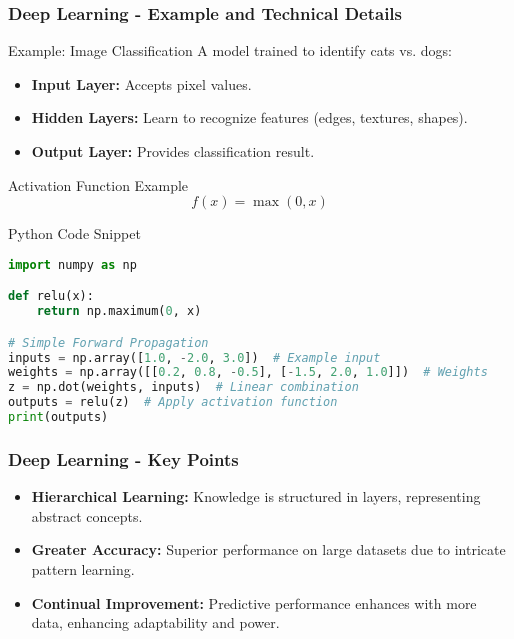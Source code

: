 \documentclass{beamer}
\begin{document}
\begin{frame}[fragile]
    \frametitle{Deep Learning - Example and Technical Details}
    \begin{block}{Example: Image Classification}
        A model trained to identify cats vs. dogs:
        \begin{itemize}
            \item \textbf{Input Layer:} Accepts pixel values.
            \item \textbf{Hidden Layers:} Learn to recognize features (edges, textures, shapes).
            \item \textbf{Output Layer:} Provides classification result.
        \end{itemize}
    \end{block}

    \begin{block}{Activation Function Example}
        \begin{equation}
            f(x) = \max(0, x)
        \end{equation}
    \end{block}

    \begin{block}{Python Code Snippet}
        \begin{lstlisting}[language=Python]
import numpy as np

def relu(x):
    return np.maximum(0, x)

# Simple Forward Propagation
inputs = np.array([1.0, -2.0, 3.0])  # Example input
weights = np.array([[0.2, 0.8, -0.5], [-1.5, 2.0, 1.0]])  # Weights
z = np.dot(weights, inputs)  # Linear combination
outputs = relu(z)  # Apply activation function
print(outputs)
        \end{lstlisting}
    \end{block}
\end{frame}

\begin{frame}[fragile]
    \frametitle{Deep Learning - Key Points}
    \begin{itemize}
        \item \textbf{Hierarchical Learning:} Knowledge is structured in layers, representing abstract concepts.
        \item \textbf{Greater Accuracy:} Superior performance on large datasets due to intricate pattern learning.
        \item \textbf{Continual Improvement:} Predictive performance enhances with more data, enhancing adaptability and power.
    \end{itemize}
\end{frame}
\end{document}
